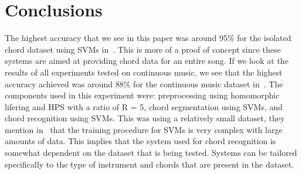\documentclass{sig-alternate}
\begin{document}



\section{Conclusions}

The highest accuracy that we see in this paper was around 95\% for the isolated chord dataset using SVMs in~\cite{Morman:2006}. This is more of a proof of concept since these systems are aimed at providing chord data for an entire song. If we look at the results of all experiments tested on continuous music, we see that the highest accuracy achieved was around 88\% for the continuous music dataset in~\cite{Morman:2006}. The components used in this experiment were: preprocessing using homomorphic lifering and HPS with a ratio of R = 5, chord segmentation using SVMs, and chord recognition using SVMs. This was using a relatively small dataset, they mention in~\cite{Morman:2006} that the training procedure for SVMs is very complex with large amounts of data. This implies that the system used for chord recognition is somewhat dependent on the dataset that is being tested. Systems can be tailored specifically to the type of instrument and chords that are present in the dataset.
\end{document}
